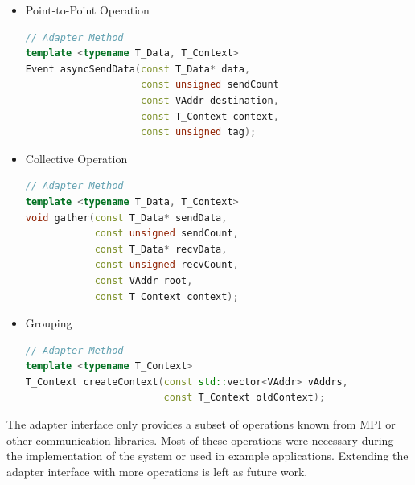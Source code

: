 \begin{itemize}

\item Point-to-Point Operation

  \begin{minipage}[t]{\textwidth} 
    \begin{lstlisting}[language=C++, breaklines=false, label={}]
// Adapter Method      
template <typename T_Data, T_Context>      
Event asyncSendData(const T_Data* data,      
                    const unsigned sendCount
                    const VAddr destination,
                    const T_Context context,
                    const unsigned tag); 
    \end{lstlisting}
    \end{minipage}
    
\item Collective Operation
  
  \begin{minipage}[t]{\textwidth} 
    \begin{lstlisting}[language=C++, breaklines=false, label={}]
// Adapter Method      
template <typename T_Data, T_Context>      
void gather(const T_Data* sendData,
            const unsigned sendCount,
            const T_Data* recvData,
            const unsigned recvCount,
            const VAddr root,
            const T_Context context);
    \end{lstlisting}
    \end{minipage}

\item Grouping
  
  \begin{minipage}[t]{\textwidth} 
    \begin{lstlisting}[language=C++, breaklines=false, label={}]
// Adapter Method
template <typename T_Context>      
T_Context createContext(const std::vector<VAddr> vAddrs,
                        const T_Context oldContext);
    \end{lstlisting}
    \end{minipage}
  
\end{itemize}

\noindent The adapter interface only provides a subset of operations
known from MPI or other communication libraries.  Most of these
operations were necessary during the implementation of the system or
used in example applications. Extending the adapter interface with
more operations is left as future work.



